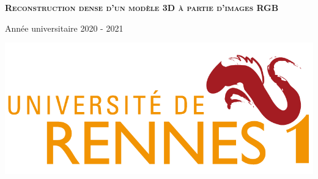 \begin{titlepage}
\begin{center}
    \vspace{4cm}

    \textsc{\Huge \textbf{Reconstruction dense d'un modèle 3D à partie d'images RGB}}\\    
    \vfill

    \begin{minipage}{0.45\textwidth}
      \begin{flushleft}
        \vspace{0.5cm}
        {\large Année universitaire 2020 - 2021}
      \end{flushleft}
    \end{minipage}
    \begin{minipage}{0.45\textwidth}
      \begin{flushright}
        \includegraphics[width=0.9\columnwidth]{datas/logo_univ.png}~\\
      \end{flushright}
    \end{minipage}

  \end{center}
\end{titlepage}